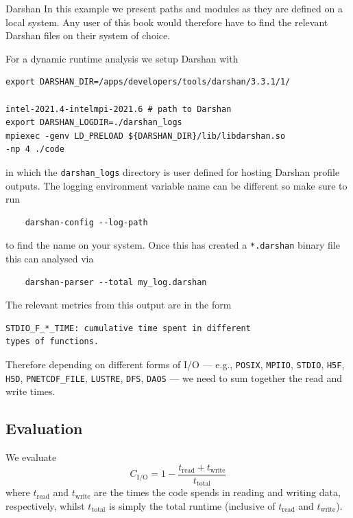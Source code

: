 \begin{instructions}{Darshan}
In this example we present paths and modules as they are defined on a local system. Any user of this book would therefore have to find the relevant Darshan files on their system of choice.

For a dynamic runtime analysis we setup Darshan with
\begin{verbatim}
export DARSHAN_DIR=/apps/developers/tools/darshan/3.3.1/1/

intel-2021.4-intelmpi-2021.6 # path to Darshan
export DARSHAN_LOGDIR=./darshan_logs
mpiexec -genv LD_PRELOAD ${DARSHAN_DIR}/lib/libdarshan.so
-np 4 ./code
\end{verbatim}
in which the \texttt{darshan\_logs} directory is user defined for hosting Darshan profile outputs. The logging environment variable name can be different so make sure to run
\begin{verbatim}
    darshan-config --log-path
\end{verbatim}
to find the name on your system.
Once this has created a \texttt{*.darshan} binary file this can analysed via
\begin{verbatim}
    darshan-parser --total my_log.darshan 
\end{verbatim}

The relevant metrics from this output are in the form
\begin{verbatim}
STDIO_F_*_TIME: cumulative time spent in different 
types of functions.
\end{verbatim}
Therefore depending on different forms of I/O --- e.g., \texttt{POSIX}, \texttt{MPIIO}, \texttt{STDIO}, \texttt{H5F}, \texttt{H5D}, \texttt{PNETCDF\_FILE}, \texttt{LUSTRE}, \texttt{DFS}, \texttt{DAOS} --- we need to sum together the read and write times.
\end{instructions}


\subsection{Evaluation}

\begin{performancemetric}
 We evaluate 
 \[
  C_{\text{I/O}} = 1 - \frac{t_{\text{read}} + t_{\text{write}}}{t_{\text{total}}}
\]
where $t_{\text{read}}$ and $t_{\text{write}}$ are the times the code spends in reading and writing data, respectively, whilst $t_{\text{total}}$ is simply the total runtime (inclusive of $t_{\text{read}}$ and $t_{\text{write}}$).
\end{performancemetric}

